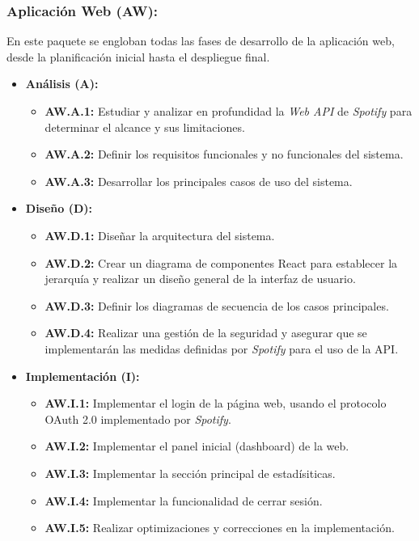 \subsubsection{Aplicación Web (AW):}

En este paquete se engloban todas las fases de desarrollo de la aplicación web, desde la planificación inicial hasta el despliegue final.

\begin{itemize}
    \item \textbf{Análisis (A):}
          \begin{itemize}
              \item \textbf{AW.A.1:} Estudiar y analizar en profundidad la \textit{Web API} de \textit{Spotify} para determinar el alcance y sus limitaciones.
              \item \textbf{AW.A.2:} Definir los requisitos funcionales y no funcionales del sistema.
              \item \textbf{AW.A.3:} Desarrollar los principales casos de uso del sistema.
          \end{itemize}

          \vspace{2em}

    \item \textbf{Diseño (D):}
          \begin{itemize}
              \item \textbf{AW.D.1:} Diseñar la arquitectura del sistema.
              \item \textbf{AW.D.2:} Crear un diagrama de componentes React para establecer la jerarquía y realizar un diseño general de la interfaz de usuario.
              \item \textbf{AW.D.3:} Definir los diagramas de secuencia de los casos principales.
              \item \textbf{AW.D.4:} Realizar una gestión de la seguridad y asegurar que se implementarán las medidas definidas por \textit{Spotify} para el uso de la API.
          \end{itemize}

    \item \textbf{Implementación (I):}
          \begin{itemize}
              \item \textbf{AW.I.1:} Implementar el login de la página web, usando el protocolo OAuth 2.0 implementado por \textit{Spotify}.
              \item \textbf{AW.I.2:} Implementar el panel inicial (dashboard) de la web.
              \item \textbf{AW.I.3:} Implementar la sección principal de estadísiticas.
              \item \textbf{AW.I.4:} Implementar la funcionalidad de cerrar sesión.
              \item \textbf{AW.I.5:} Realizar optimizaciones y correcciones en la implementación.
          \end{itemize}


\end{itemize}
